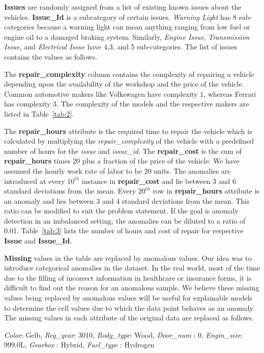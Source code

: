 \documentclass{article}
\begin{document}
\textbf{Issues} are randomly assigned from a list of existing known issues about the vehicles. \textbf{Issue\_Id} is a subcategory of certain issues. \textit{Warning Light} has 8 sub-categories because a warning light can mean anything ranging from low fuel or engine oil to a damaged braking system. Similarly, \textit{Engine Issue}, \textit{Transmission Issue}, and \textit{Electrical Issue} have 4,3, and 5 sub-categories. The list of issues contains the values as follows.

The \textbf{repair\_complexity} column contains the complexity of repairing a vehicle depending upon the availability of the workshop and the price of the vehicle. Common automotive makers like Volkswagen have complexity 1, whereas Ferrari has complexity 3. The complexity of the models and the respective makers are listed in Table~\ref{tab:2}.

The \textbf{repair\_hours} attribute is the required time to repair the vehicle which is calculated by multiplying the \textit{repair\_complexity} of the vehicle with a predefined number of hours for the \textit{issue} and \textit{issue\_id}. The \textbf{repair\_cost} is the sum of \textbf{repair\_hours} times 20 plus a fraction of the price of the vehicle. We have assumed the hourly work rate of labor to be 20 units.  The anomalies are introduced at every $10^{th}$ instance in \textbf{repair\_cost} and lie between 3 and 6 standard deviations from the mean. Every $20^{th}$ row in \textbf{repair\_hours} attribute is an anomaly and lies between 3 and 4 standard deviations from the mean. This ratio can be modified to suit the problem statement. If the goal is anomaly detection in an imbalanced setting, the anomalies can be diluted to a ratio of 0.01.  
Table~\ref{tab:3} lists the number of hours and cost of repair for respective \textbf{Issue} and \textbf{Issue\_Id}. 

\textbf{Missing} values in the table are replaced by anomalous values. Our idea was to introduce categorical anomalies in the dataset. In the real world, most of the time due to the filling of incorrect information in healthcare or insurance forms, it is difficult to find out the reason for an anomalous sample. We believe these missing values being replaced by anomalous values will be useful for explainable models to determine the cell values due to which the data point behaves as an anomaly. The missing values in each attribute of the original data are replaced as follows.

{\textit{Color}: Gelb, \textit{Reg\_year}: 3010, \textit{Body\_type}: Wood, \textit{Door\_num} : 0,
\textit{Engin\_size}: 999.0L, \textit{Gearbox} : Hybrid, \textit{Fuel\_type} : Hydrogen}
\end{document}

